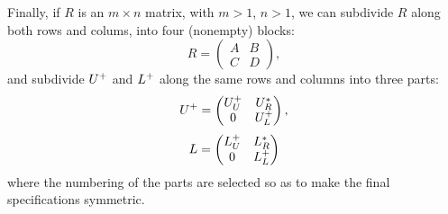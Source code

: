Finally, if $R$ is an $m \times n$ matrix, with $m > 1$, $n > 1$, we can subdivide $R$ along both rows and colums, into four (nonempty) blocks:
\begin{equation*}
  R =
  \begin{pmatrix}
    A & B \\ 
    C & D
  \end{pmatrix},
\end{equation*}
and subdivide $U^+$ and $L^+$ along the same rows and columns into three parts:
\begin{equation*}
  U^+ = 
  \begin{pmatrix}
    U_U^+ & U_R^* \\
    0   & U_L^+
  \end{pmatrix},
\end{equation*}
\begin{equation*}
  L = 
  \begin{pmatrix}
    L_U^+ & L_R^* \\
    0   & L_L^+
  \end{pmatrix}
\end{equation*}
where the numbering of the parts are selected so as to make the final specifications symmetric.


